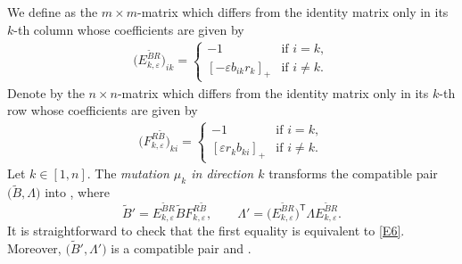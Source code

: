 We define  as the $m\times m$-matrix which differs from the identity matrix only in its $k$-th column whose coefficients are given by
 \begin{align*}
 \bigl(E_{k,\varepsilon}^{\tilde{B}R}\bigr)_{ik}=\begin{cases}
 -1& \text{if } i=k,\\
 [-\varepsilon b_{ik}r_k]_+& \text{if } i\neq k.
 \end{cases}
 \end{align*}
 Denote by  the $n\times n$-matrix which differs from the identity matrix only in its $k$-th row whose coefficients are given by
 \begin{align*}
 \bigl(F^{R\tilde{B}}_{k,\varepsilon}\bigr)_{ki}=\begin{cases}
 -1& \text{if } i=k,\\
 [\varepsilon r_{k}b_{ki}]_+& \text{if } i\neq k.
 \end{cases}
 \end{align*}
Let $k\in [1,n]$.
The {\it mutation $\mu_k$ in direction $k$} transforms the compatible pair $\bigl(\tilde{B},\Lambda\bigr)$ into , where
\[
\tilde{B}'=E_{k,\varepsilon}^{\tilde{B}R}\tilde{B}F_{k,\varepsilon}^{R\tilde{B}},\qquad \Lambda'=\bigl(E_{k,\varepsilon}^{\tilde{B}R}\bigr)^{\mathsf T}\Lambda E_{k,\varepsilon}^{\tilde{B}R}.
\]
It is straightforward to check that the first equality is equivalent to \eqref{E6}. Moreover, $\bigl(\tilde{B}', \Lambda'\bigr)$ is a compatible pair and .

